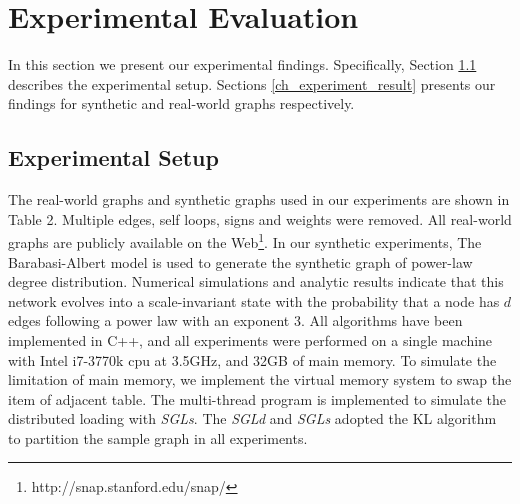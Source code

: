 \documentclass{sig-alternate-2013}
\begin{document}
\section{Experimental Evaluation}
In this section we present our experimental findings. Specifically, Section \ref{ch_experiment_setup} describes the experimental setup.
Sections \ref{ch_experiment_result} presents our findings for synthetic and real-world graphs respectively.
\subsection{Experimental Setup}\label{ch_experiment_setup}

The real-world graphs and synthetic graphs used in our experiments are shown in Table 2.
Multiple edges, self loops, signs and weights were removed.
All real-world graphs are publicly available on the Web\footnote{http://snap.stanford.edu/snap/}.
In our synthetic experiments, The Barabasi-Albert model\cite{BA:randomgraph} is used to generate the synthetic graph of power-law degree distribution.
Numerical simulations and analytic results indicate that this network evolves into a scale-invariant state with the probability that a node has $d$ edges following a power law with an exponent 3.
All algorithms have been implemented in C++, and all experiments were performed on a single machine with Intel i7-3770k cpu at 3.5GHz, and 32GB of main memory.
To simulate the limitation of main memory, we implement the virtual memory system to swap the item of adjacent table. 
The multi-thread program is implemented to simulate the distributed loading with \textit{SGLs}. The \textit{SGLd} and \textit{SGLs} adopted the KL algorithm to partition the sample graph in all experiments.
\end{document}
